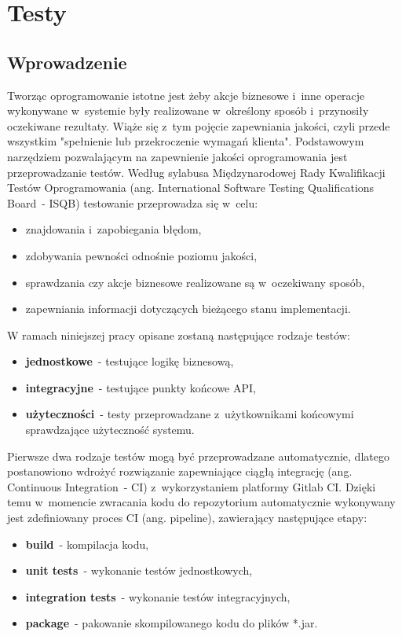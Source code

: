 \chapter{Testy}
\section{Wprowadzenie}
Tworząc oprogramowanie istotne jest żeby akcje biznesowe i~inne operacje wykonywane w~systemie były realizowane w~określony sposób i~przynosiły oczekiwane rezultaty.
Wiąże się z~tym pojęcie zapewniania jakości, czyli przede wszystkim "spełnienie lub przekroczenie wymagań klienta"\cite{book:jakosc-projektow-informatycznych}.
Podstawowym narzędziem pozwalającym na zapewnienie jakości oprogramowania jest przeprowadzanie testów.
Według sylabusa Międzynarodowej Rady Kwalifikacji Testów Oprogramowania (ang. International Software Testing Qualifications Board~- ISQB)\cite{url:istqb-syllabus} testowanie przeprowadza się w~celu:
\begin{itemize}
    \item znajdowania i~zapobiegania błędom,
    \item zdobywania pewności odnośnie poziomu jakości,
    \item sprawdzania czy akcje biznesowe realizowane są w~oczekiwany sposób,
    \item zapewniania informacji dotyczących bieżącego stanu implementacji.
\end{itemize}

\par
W ramach niniejszej pracy opisane zostaną następujące rodzaje testów:
\begin{itemize}
    \item \textbf{jednostkowe}~- testujące logikę biznesową,
    \item \textbf{integracyjne}~- testujące punkty końcowe API,
    \item \textbf{użyteczności}~- testy przeprowadzane z~użytkownikami końcowymi sprawdzające użyteczność systemu.
\end{itemize}

\par
Pierwsze dwa rodzaje testów mogą być przeprowadzane automatycznie, dlatego postanowiono wdrożyć rozwiązanie zapewniające ciągłą integrację (ang. Continuous Integration~- CI) z~wykorzystaniem platformy Gitlab CI\cite{tech:gitlab-pipelines}.
Dzięki temu w~momencie zwracania kodu do repozytorium automatycznie wykonywany jest zdefiniowany proces CI (ang. pipeline), zawierający następujące etapy:
\begin{itemize}
    \item \textbf{build}~- kompilacja kodu,
    \item \textbf{unit tests}~- wykonanie testów jednostkowych,
    \item \textbf{integration tests}~- wykonanie testów integracyjnych,
    \item \textbf{package}~- pakowanie skompilowanego kodu do plików *.jar.
\end{itemize}


